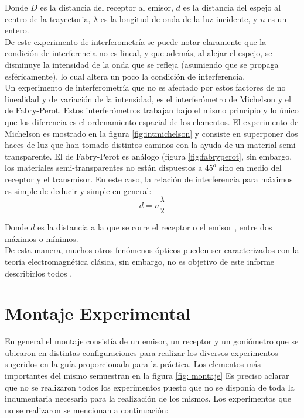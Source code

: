 \documentclass[prb,aps,twocolumn,preprintnumbers,amsmath,amssymb]{revtex4}
\begin{document}
Donde $D$ es la distancia del receptor al emisor, $d$ es la distancia del espejo al centro de la trayectoria, $\lambda$ es la longitud de onda de la luz incidente, y $n$ es un entero.\\

De este experimento de interferometría se puede notar claramente que la condición de interferencia no es lineal, y que además, al alejar el espejo, se disminuye la intensidad de la onda que se refleja (asumiendo que se propaga esféricamente), lo cual altera un poco la condición de interferencia.\\

Un experimento de interferometría que no es afectado por estos factores de no linealidad y de variación de la intensidad, es el interferómetro de Michelson y el de Fabry-Perot. Estos interferómetros trabajan bajo el mismo principio y lo único que los diferencia es el ordenamiento espacial de los elementos. El experimento de Michelson es mostrado en la figura \ref{fig:intmichelson} y consiste en superponer dos haces de luz que han tomado distintos caminos con la ayuda de un material semi-transparente. El de Fabry-Perot es análogo (figura \ref{fig:fabryperot}, sin embargo, los materiales semi-transparentes no están dispuestos a $45^o$ sino en medio del receptor y el transmisor.  En este caso, la relación de interferencia para máximos es simple de deducir y simple en general:\\

\begin{equation}
d = n\frac{\lambda}{2}
\label{eq:Michelson}
\end{equation}

Donde $d$ es la distancia a la que se corre el receptor o el emisor , entre dos máximos o mínimos. \\

De esta manera, muchos otros fenómenos ópticos pueden ser caracterizados con la teoría electromagnética clásica, sin embargo, no es objetivo de este informe describirlos todos .\\ 

\section{Montaje Experimental}

En general el montaje consistía de un emisor, un receptor y un goniómetro que se ubicaron en distintas configuraciones para realizar los diversos experimentos sugeridos en la guía proporcionada para la práctica. Los elementos más importantes del mismo semuestran en la figura \ref{fig: montaje} Es preciso aclarar que no se realizaron todos los experimentos puesto que no se disponía de toda la indumentaria necesaria para la realización de los mismos. Los experimentos que no se realizaron se mencionan a continuación:
\end{document}
